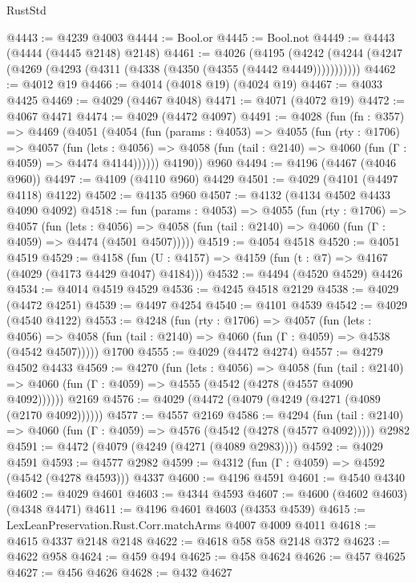 \begin{lexlean}{RustStd}
\begin{coremodule}
@4443 := @4239 @4003
@4444 := Bool.or
@4445 := Bool.not
@4449 := @4443 (@4444 (@4445 @2148) @2148)
@4461 := @4026
    (@4195 (@4242 (@4244 (@4247 (@4269 (@4293 (@4311 (@4338 (@4350 (@4355 (@4442 @4449)))))))))))
@4462 := @4012 @19
@4466 := @4014 (@4018 @19) (@4024 @19)
@4467 := @4033 @4425
@4469 := @4029 (@4467 @4048)
@4471 := @4071 (@4072 @19)
@4472 := @4067 @4471
@4474 := @4029 (@4472 @4097)
@4491 := @4028
    (fun (fn : @357) =>
    @4469
      (@4051
        (@4054
          (fun (params : @4053) =>
          @4055
            (fun (rty : @1706) =>
            @4057
              (fun (lets : @4056) =>
              @4058 (fun (tail : @2140) => @4060 (fun (Γ : @4059) => @4474 @4144))))))
        @4190))
    @960
@4494 := @4196 (@4467 (@4046 @960))
@4497 := @4109 (@4110 @960) @4429
@4501 := @4029 (@4101 (@4497 @4118) @4122)
@4502 := @4135 @960
@4507 := @4132 (@4134 @4502 @4433 @4090 @4092)
@4518 := fun (params : @4053) =>
  @4055
    (fun (rty : @1706) =>
    @4057
      (fun (lets : @4056) =>
      @4058 (fun (tail : @2140) => @4060 (fun (Γ : @4059) => @4474 (@4501 @4507)))))
@4519 := @4054 @4518
@4520 := @4051 @4519
@4529 := @4158 (fun (U : @4157) => @4159 (fun (t : @7) => @4167 (@4029 (@4173 @4429 @4047) @4184)))
@4532 := @4494 (@4520 @4529) @4426
@4534 := @4014 @4519 @4529
@4536 := @4245 @4518 @2129
@4538 := @4029 (@4472 @4251)
@4539 := @4497 @4254
@4540 := @4101 @4539
@4542 := @4029 (@4540 @4122)
@4553 := @4248
    (fun (rty : @1706) =>
    @4057
      (fun (lets : @4056) =>
      @4058 (fun (tail : @2140) => @4060 (fun (Γ : @4059) => @4538 (@4542 @4507)))))
    @1700
@4555 := @4029 (@4472 @4274)
@4557 := @4279 @4502 @4433
@4569 := @4270
    (fun (lets : @4056) =>
    @4058
      (fun (tail : @2140) => @4060 (fun (Γ : @4059) => @4555 (@4542 (@4278 (@4557 @4090 @4092))))))
    @2169
@4576 := @4029 (@4472 (@4079 (@4249 (@4271 (@4089 (@2170 @4092))))))
@4577 := @4557 @2169
@4586 := @4294
    (fun (tail : @2140) => @4060 (fun (Γ : @4059) => @4576 (@4542 (@4278 (@4577 @4092)))))
    @2982
@4591 := @4472 (@4079 (@4249 (@4271 (@4089 @2983))))
@4592 := @4029 @4591
@4593 := @4577 @2982
@4599 := @4312 (fun (Γ : @4059) => @4592 (@4542 (@4278 @4593))) @4337
@4600 := @4196 @4591
@4601 := @4540 @4340
@4602 := @4029 @4601
@4603 := @4344 @4593
@4607 := @4600 (@4602 @4603) (@4348 @4471)
@4611 := @4196 @4601 @4603 (@4353 @4539)
@4615 := LexLeanPreservation.Rust.Corr.matchArms @4007 @4009 @4011
@4618 := @4615 @4337 @2148 @2148
@4622 := @4618 @58 @58 @2148 @372
@4623 := @4622 @958
@4624 := @459 @494
@4625 := @458 @4624
@4626 := @457 @4625
@4627 := @456 @4626
@4628 := @432 @4627

\end{coremodule}
\end{lexlean}
